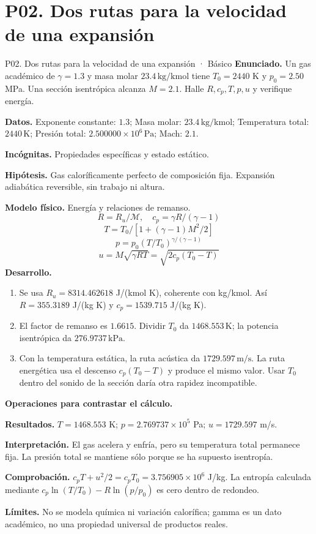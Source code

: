 \section{P02. Dos rutas para la velocidad de una expansión}
\begin{studiumworked}{P02. Dos rutas para la velocidad de una expansión · Básico}
\textbf{Enunciado.} Un gas académico de $\gamma=1.3$ y masa molar $23.4\,\mathrm{kg/kmol}$ tiene $T_0=2440$ K y $p_0=2.50$ MPa. Una sección isentrópica alcanza $M=2.1$. Halle $R,c_p,T,p,u$ y verifique energía.

\textbf{Datos.} Exponente constante: $1.3$; Masa molar: $23.4\,\mathrm{kg/kmol}$; Temperatura total: $2440\,\mathrm{K}$; Presión total: $2.500000\times10^{6}\,\mathrm{Pa}$; Mach: $2.1$.

\textbf{Incógnitas.} Propiedades específicas y estado estático.

\textbf{Hipótesis.} Gas caloríficamente perfecto de composición fija. Expansión adiabática reversible, sin trabajo ni altura.

\textbf{Modelo físico.} Energía y relaciones de remanso.
\[R=R_u/\mathcal M,\quad c_p=\gamma R/(\gamma-1)\]
\[T=T_0/[1+(\gamma-1)M^2/2]\]
\[p=p_0(T/T_0)^{\gamma/(\gamma-1)}\]
\[u=M\sqrt{\gamma RT}=\sqrt{2c_p(T_0-T)}\]
\textbf{Desarrollo.}
\begin{enumerate}
\item Se usa $R_u=8314.462618$ J/(kmol K), coherente con kg/kmol. Así $R=355.3189$ J/(kg K) y $c_p=1539.715$ J/(kg K).
\item El factor de remanso es $1.6615$. Dividir $T_0$ da $1468.553\,\mathrm{K}$; la potencia isentrópica da $276.9737\,\mathrm{kPa}$.
\item Con la temperatura estática, la ruta acústica da $1729.597\,\mathrm{m/s}$. La ruta energética usa el descenso $c_p(T_0-T)$ y produce el mismo valor. Usar $T_0$ dentro del sonido de la sección daría otra rapidez incompatible.
\end{enumerate}
\textbf{Operaciones para contrastar el cálculo.}

\textbf{Resultados.} $T=1468.553$ K; $p=2.769737\times10^{5}$ Pa; $u=1729.597$ m/s.

\textbf{Interpretación.} El gas acelera y enfría, pero su temperatura total permanece fija. La presión total se mantiene sólo porque se ha supuesto isentropía.

\textbf{Comprobación.} $c_pT+u^2/2=c_pT_0=3.756905\times10^{6}$ J/kg. La entropía calculada mediante $c_p\ln(T/T_0)-R\ln(p/p_0)$ es cero dentro de redondeo.

\textbf{Límites.} No se modela química ni variación calorífica; gamma es un dato académico, no una propiedad universal de productos reales.
\end{studiumworked}

